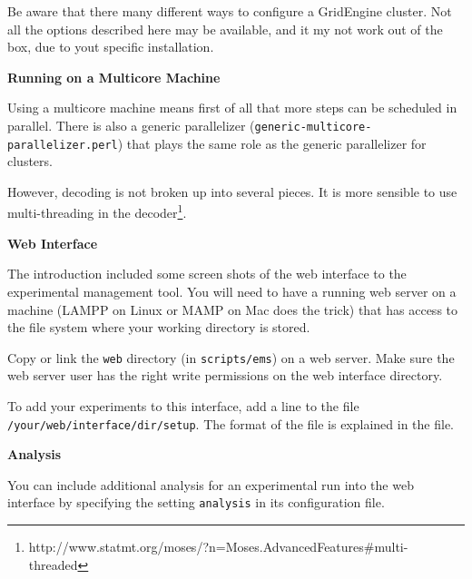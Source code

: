 Be aware that there many different ways to configure a GridEngine cluster. Not all the options described here may be available, and it my not work out of the box, due to yout specific installation.



\vspace{2mm}

{\bf 
\label{experiment-perl.texntoc23}Running on a Multicore Machine}


Using a multicore machine means first of all that more steps can be scheduled in parallel. There is also a generic parallelizer ({\tt generic-multicore-parallelizer.perl}) that plays the same role as the generic parallelizer for clusters.



However, decoding is not broken up into several pieces. It is more sensible to use multi-threading in the decoder\footnote{\sf http://www.statmt.org/moses/?n=Moses.AdvancedFeatures\#multi-threaded}.



\vspace{2mm}

{\bf 
\label{experiment-perl.texntoc24}Web Interface}


The introduction included some screen shots of the web interface to the experimental management tool. You will need to have a running web server on a machine (LAMPP on Linux or MAMP on Mac does the trick) that has access to the file system where your working directory is stored.



Copy or link the {\tt web} directory (in {\tt scripts/ems}) on a web server. Make sure the web server user has the right write permissions on the web interface directory.



To add your experiments to this interface, add a line to the file {\tt /your/web/interface/dir/setup}. The format of the file is explained in the file.



\vspace{2mm}

{\bf 
\label{experiment-perl.texntoc25}Analysis}


You can include additional analysis for an experimental run into the web interface by specifying the setting {\tt analysis} in its configuration file.






\colorbox{gray}{%
}

